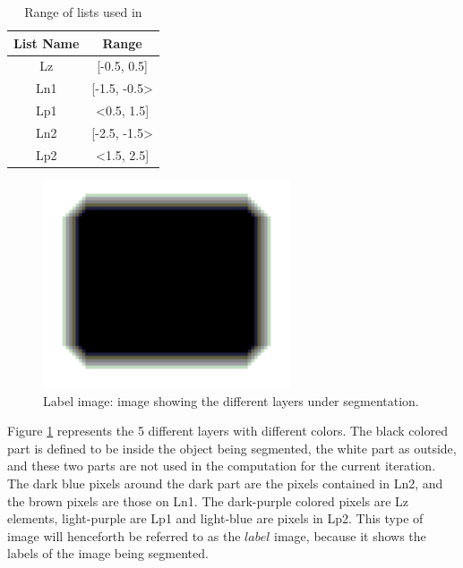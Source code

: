 \begin{table}[h] %
	\begin{tabular}{| c | c |} 
	\hline
	List Name & Range\\
	\hline
	Lz & [-0.5, 0.5]\\
	Ln1 & [-1.5, -0.5>\\
	Lp1 & <0.5, 1.5]\\
	Ln2 & [-2.5, -1.5>\\
	Lp2 & <1.5, 2.5]\\
	\hline
	\end{tabular}
	\caption{Range of lists used in \cite{lankton09}}
	\label{rangeTab1}
\end{table}

\begin{figure}[h!]
\centering
\includegraphics[width=0.65\textwidth]{implemented/labelExample}
\caption{Label image: image showing the different layers under segmentation.}
\label{labelExample}
\end{figure}

Figure \ref{labelExample} represents the 5 different layers with different colors. The black colored part is defined to be inside the object being segmented, the white part as outside, and these two parts are not used in the computation for the current iteration. The dark blue pixels around the dark part are the pixels contained in Ln2, and the brown pixels are those on Ln1. The dark-purple colored pixels are Lz elements, light-purple are Lp1 and light-blue are pixels in Lp2. This type of image will henceforth be referred to as the $label$ image, because it shows the labels of the image being segmented.

